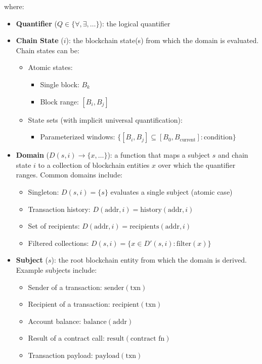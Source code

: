 \documentclass[9pt]{extreport}
\begin{document}
where:
\begin{itemize}
    \item \textbf{Quantifier} ($Q \in \{\forall, \exists, \ldots\}$): the logical quantifier

    \item \textbf{Chain State} ($i$): the blockchain state(s) from which the domain is evaluated.  Chain states can be:
    \begin{itemize}
        \item Atomic states:
        \begin{itemize}
            \item Single block: $B_k$
            \item Block range: $[B_i, B_j]$
        \end{itemize}
        \item State sets (with implicit universal quantification):
        \begin{itemize}
            \item Parameterized windows: $\{[B_i, B_j] \subseteq [B_0, B_{\text{current}}] : \text{condition}\}$
        \end{itemize}
    \end{itemize}
    
    \item \textbf{Domain} ($D(s, i) \rightarrow \{x, \ldots\}$): a function that maps a subject $s$ and chain state $i$ to a collection of blockchain entities $x$ over which the quantifier ranges. Common domains include:
    \begin{itemize}
        \item Singleton: $D(s, i) = \{s\}$ evaluates a single subject (atomic case)
        \item Transaction history: $D(\text{addr}, i) = \text{history}(\text{addr}, i)$ 
        \item Set of recipients: $D(\text{addr}, i) = \text{recipients}(\text{addr}, i)$
        \item Filtered collections: $D(s, i) = \{x \in D'(s, i) : \text{filter}(x)\}$
    \end{itemize}
    
    \item \textbf{Subject} ($s$): the root blockchain entity from which the domain is derived. Example subjects include:
    \begin{itemize}
        \item Sender of a transaction: $\text{sender}(\text{txn})$
        \item Recipient of a transaction: $\text{recipient}(\text{txn})$
        \item Account balance: $\text{balance}(\text{addr})$
        \item Result of a contract call: $\text{result}(\text{contract fn})$
        \item Transaction payload: $\text{payload}(\text{txn})$
    \end{itemize}


\end{itemize}
\end{document}
